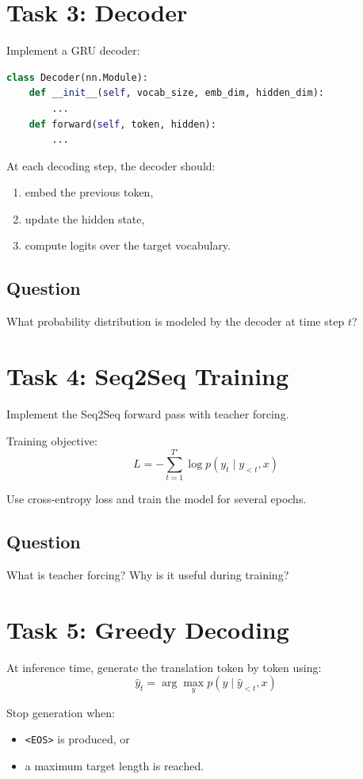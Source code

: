 \documentclass[12pt]{article}
\begin{document}
\section{Task 3: Decoder}
Implement a GRU decoder:

\begin{lstlisting}[language=Python]
class Decoder(nn.Module):
    def __init__(self, vocab_size, emb_dim, hidden_dim):
        ...
    def forward(self, token, hidden):
        ...
\end{lstlisting}

At each decoding step, the decoder should:
\begin{enumerate}
    \item embed the previous token,
    \item update the hidden state,
    \item compute logits over the target vocabulary.
\end{enumerate}

\subsection*{Question}
What probability distribution is modeled by the decoder at time step $t$?

\section{Task 4: Seq2Seq Training}
Implement the Seq2Seq forward pass with teacher forcing.

Training objective:
\[
L = - \sum_{t=1}^{T'} \log p(y_t \mid y_{<t}, x)
\]

Use cross-entropy loss and train the model for several epochs.

\subsection*{Question}
What is teacher forcing? Why is it useful during training?

\section{Task 5: Greedy Decoding}
At inference time, generate the translation token by token using:
\[
\hat{y}_t = \arg\max_y p(y \mid \hat{y}_{<t}, x)
\]

Stop generation when:
\begin{itemize}
    \item \texttt{<EOS>} is produced, or
    \item a maximum target length is reached.
\end{itemize}
\end{document}
